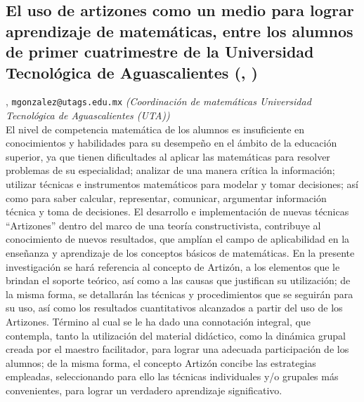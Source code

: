 \subsection{\sffamily El uso de artizones como un medio para lograr aprendizaje de matemáticas, entre los alumnos de primer cuatrimestre de la Universidad Tecnológica de Aguascalientes {\footnotesize (, )}} \label{reg-1802} 
, {\tt mgonzalez@utags.edu.mx}  {\slshape (Coordinación de matemáticas Universidad Tecnológica de Aguascalientes (UTA))}\\
          \noindent El nivel de competencia matemática de los alumnos es insuficiente en conocimientos y habilidades para su desempeño en el ámbito de la educación superior, ya que tienen dificultades al aplicar las matemáticas para resolver problemas de su especialidad; analizar de una manera crítica la información; utilizar técnicas e instrumentos matemáticos para modelar y tomar decisiones; así como para saber calcular, representar, comunicar, argumentar información técnica y toma de decisiones. El desarrollo e implementación de nuevas técnicas “Artizones” dentro del marco de una teoría constructivista, contribuye al conocimiento de nuevos resultados, que amplían el campo de aplicabilidad en la enseñanza y aprendizaje de los conceptos básicos de matemáticas.
En la presente investigación se hará referencia al concepto de Artizón, a los elementos que le brindan el soporte teórico, así como a las causas que justifican su utilización; de la misma forma, se detallarán las técnicas y procedimientos que se seguirán para su uso, así como los resultados cuantitativos alcanzados a partir del uso de los Artizones. Término al cual se le ha dado una connotación integral, que contempla, tanto la utilización del material didáctico, como la dinámica grupal creada por el maestro facilitador, para lograr una adecuada participación de los alumnos; de la misma forma, el concepto Artizón concibe las estrategias empleadas, seleccionando para ello las técnicas individuales y/o grupales más convenientes, para lograr un verdadero aprendizaje significativo.
